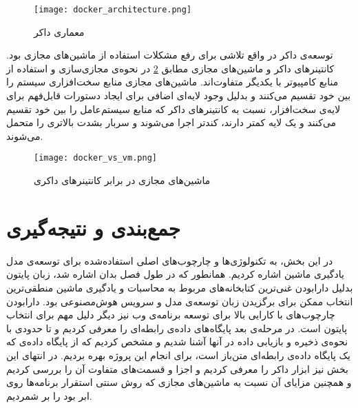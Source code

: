 \begin{figure}[!h]
\centerline{\texttt{[image: docker\_architecture.png]}}
\caption{معماری داکر\cite{dockerDockerOverview}}
\label{fig:docker_architecture}
\end{figure}

توسعه‌ی داکر در واقع تلاشی برای رفع مشکلات استفاده از ماشین‌های مجازی بود. کانتینرهای داکر و ماشین‌های مجازی مطابق \cref{fig:docker_vs_vm} در نحوه‌ی مجازی‌سازی و استفاده از منابع کامپیوتر با یکدیگر متفاوت‌اند. ماشین‌های مجازی منابع سخت‌افزاری سیستم را بین خود تقسیم می‌کنند و بدلیل وجود لایه‌ای اضافی برای ایجاد دستورات قابل‌فهم برای لایه‌ی سخت‌افزار، نسبت به کانتینرهای داکر که منابع سیستم‌عامل را بین خود تقسیم می‌کنند و یک لایه کمتر دارند، کندتر اجرا می‌شوند و سربار بشدت بالاتری را متحمل می‌شوند\cite{anderson2015docker, yadav2019docker}.

\begin{figure}[!h]
\centerline{\texttt{[image: docker\_vs\_vm.png]}}
\caption{ماشین‌های مجازی در برابر کانتینرهای داکری\cite{yadav2019docker}}
\label{fig:docker_vs_vm}
\end{figure}

\section{جمع‌بندی و نتیجه‌گیری}
در این بخش، به تکنولوژی‌ها و چارچوب‌های اصلی استفاده‌شده برای توسعه‌ی مدل یادگیری ماشین اشاره کردیم. همانطور که در طول فصل بدان اشاره شد، زبان پایتون بدلیل دارابودن غنی‌ترین کتابخانه‌های مربوط به محاسبات و یادگیری ماشین منطقی‌ترین انتخاب ممکن برای برگزیدن زبان توسعه‌ی مدل و سرویس هوش‌مصنوعی بود. دارابودن چارچوب‌های با کارایی بالا برای توسعه برنامه‌ی وب نیز دیگر دلیل مهم برای انتخاب پایتون است. در مرحله‌ی بعد پایگاه‌های داده‌ی رابطه‌ای را معرفی کردیم و تا حدودی با نحوه‌ی ذخیره‌ و بازیابی داده در آنها آشنا شدیم و مشخص کردیم که از پایگاه داده‌ی  که یک پایگاه‌ داده‌ی رابطه‌ای متن‌باز است، برای انجام این پروژه بهره‌ بردیم. در انتهای این بخش نیز ابزار داکر را معرفی کردیم و اجزا و قسمت‌های متفاوت آن را بررسی کردیم و همچنین مزایای آن نسبت به ماشین‌های مجازی که روش سنتی استقرار برنامه‌ها روی ابر بود را بر شمردیم.  